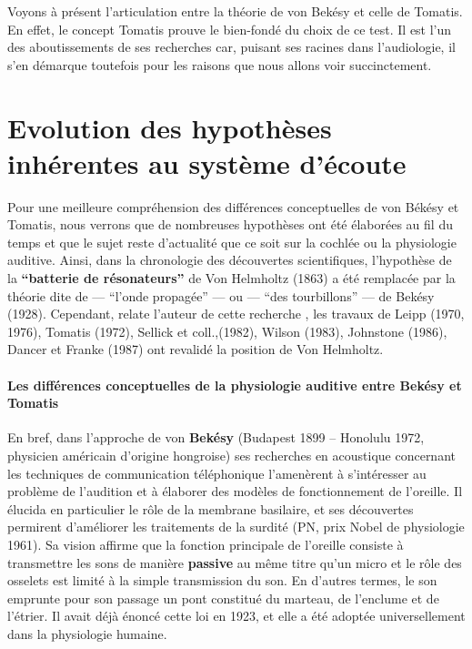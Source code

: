 Voyons à présent l'articulation entre la théorie de von Bekésy et celle de Tomatis.
En effet, le concept Tomatis prouve le bien-fondé du choix de ce test. Il est l'un des aboutissements de
ses recherches car, puisant  ses racines dans l'audiologie, il s'en
démarque toutefois pour les raisons que nous allons voir succinctement.

\section{Evolution des hypothèses inhérentes au système d'écoute}
Pour une meilleure compréhension des différences conceptuelles de von Békésy et Tomatis, nous 
verrons que de nombreuses  hypothèses ont été élaborées au fil du temps et que le sujet reste 
d'actualité que ce soit sur la cochlée ou  la physiologie auditive. %
Ainsi, dans la chronologie des découvertes scientifiques,  l'hypothèse de la \textbf{``batterie de
	résonateurs''}  de Von Helmholtz (1863)  a été remplacée par la
théorie dite de  --- ``l'onde propagée'' --- ou --- ``des
tourbillons'' ---  de Bekésy (1928).
Cependant, relate l'auteur de cette recherche \autocite[p 24---28]{auriol:cle}, les travaux de Leipp (1970, 
1976), Tomatis (1972), Sellick 
et coll.,(1982), Wilson (1983),
Johnstone (1986), Dancer et
Franke (1987) ont revalidé la position de Von Helmholtz.

\paragraph{Les différences conceptuelles de la physiologie auditive
  entre Bekésy et Tomatis}




En bref, dans  l'approche de von \textbf{ Bekésy} (Budapest 1899 -- Honolulu 1972,
physicien américain d'origine hongroise) ses
recherches en acoustique concernant les techniques de communication
téléphonique l'amenèrent à s'intéresser au problème de l'audition et à
élaborer des modèles de fonctionnement de l'oreille. Il élucida en
particulier le rôle de la membrane basilaire, et ses découvertes
permirent d'améliorer les traitements de la surdité (PN, prix
Nobel de physiologie 1961).
Sa vision affirme que la fonction principale de l'oreille 
consiste à transmettre les sons de manière \textbf{passive} au même titre qu'un micro et le rôle des 
osselets
est limité à la simple transmission du
son. En d'autres termes, le son emprunte pour son passage un pont  constitué du marteau, de l'enclume 
et de l'étrier. Il avait déjà énoncé cette loi en 1923, et elle a été adoptée
universellement dans la physiologie humaine.

